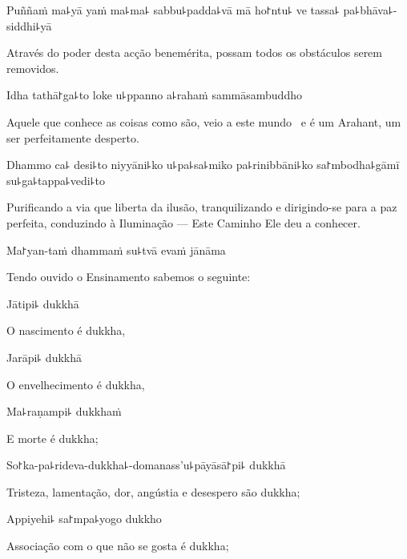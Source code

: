 Puññaṁ ma꜕yā yaṁ ma꜕ma꜕ sabbu꜕padda꜕vā mā ho꜓ntu꜕ ve tassa꜕ pa꜕bhāva꜕-siddhi꜕yā

\begin{english}
  Através do poder desta acção benemérita, possam todos os obstáculos serem removidos.
\end{english}

Idha tathā꜓ga꜕to loke u꜕ppanno a꜕rahaṁ sammāsambuddho

\begin{english}
  Aquele que conhece as coisas como são, veio a este mundo \pause\ e é um Arahant, um ser perfeitamente desperto.
\end{english}

Dhammo ca꜕ desi꜕to niyyāni꜕ko u꜕pa꜕sa꜕miko pa꜕rinibbāni꜕ko sa꜓mbodha꜕gāmī su꜕ga꜕tappa꜕vedi꜕to

\enlargethispage{\baselineskip}

\begin{english}
  Purificando a via que liberta da ilusão, tranquilizando e dirigindo-se para a paz perfeita, conduzindo à Iluminação  --- Este Caminho Ele deu a conhecer.
\end{english}

Ma꜓yan-taṁ dhammaṁ su꜕tvā evaṁ jānāma

\begin{english}
  Tendo ouvido o Ensinamento sabemos o seguinte:
\end{english}

Jātipi꜕ dukkhā

\begin{english}
  O nascimento é dukkha,
\end{english}

Jarāpi꜕ dukkhā

\begin{english}
  O envelhecimento é dukkha,
\end{english}

Ma꜕raṇampi꜕ dukkhaṁ

\begin{english}
  E morte é dukkha;
\end{english}

So꜓ka-pa꜕rideva-dukkha꜕-domanass'u꜕pāyāsā꜓pi꜕ dukkhā

\begin{english}
  Tristeza, lamentação, dor, angústia e desespero são dukkha;
\end{english}

Appiyehi꜕ sa꜓mpa꜕yogo dukkho

\begin{english}
  Associação com o que não se gosta é dukkha;
\end{english}

